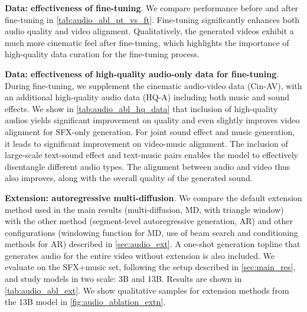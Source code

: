\textbf{Data: effectiveness of fine-tuning}.
We compare performance before and after fine-tuning in \cref{tab:audio_abl_pt_vs_ft}.
Fine-tuning significantly enhances both audio quality and video alignment.
Qualitatively, the generated videos exhibit a much more cinematic feel after fine-tuning, which highlights the importance of high-quality data curation for the fine-tuning process.



\textbf{Data: effectiveness of high-quality audio-only data for fine-tuning}.
During fine-tuning, we supplement the cinematic audio-video data (Cin-AV), with an additional high-quality audio data (HQ-A) including both music and sound effects.
We show in \cref{tab:audio_abl_hq_data} that inclusion of high-quality audios yields significant improvement on quality and even slightly improves video alignment for SFX-only generation.
For joint sound effect and music generation, it leads to significant improvement on video-music alignment.
The inclusion of large-scale text-sound effect and text-music pairs enables the model to effectively disentangle different audio types.
The alignment between audio and video thus also improves, along with the overall quality of the generated sound.




\textbf{Extension: autoregressive \vs multi-diffusion}.
We compare the default extension method used in the main results (multi-diffusion, MD, with triangle window) with the other method (segment-level autoregressive generation, AR) and other configurations (windowing function for MD, use of beam search and conditioning methods for AR) described in \cref{sec:audio_ext}.
A one-shot generation topline that generates audio for the entire video without extension is also included.
We evaluate on the \OursAudioBenchSGen SFX+music set, following the setup described in \cref{sec:main_res},
and study models in two scale: 3B and 13B.
Results are shown in \cref{tab:audio_abl_ext}. We show qualitative samples for extension methods from the 13B model in \cref{fig:audio_ablation_extn}.





